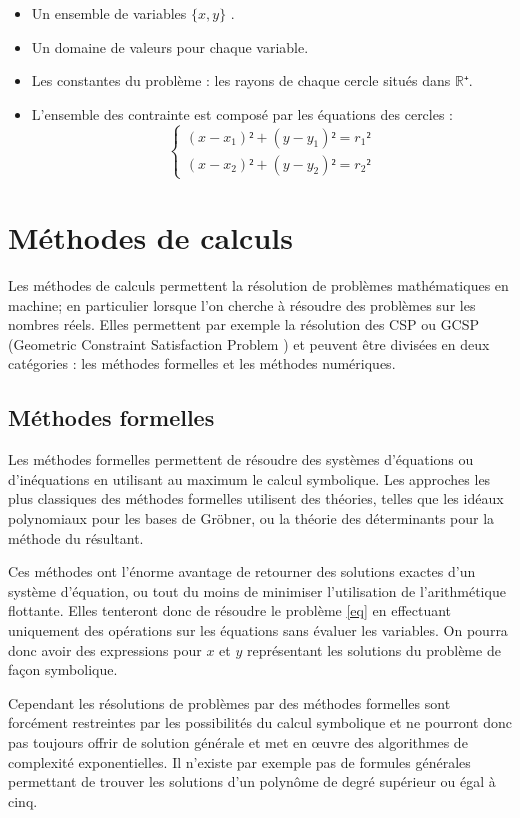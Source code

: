 \begin{itemize}
\item
Un ensemble de variables $\{x,y\}$ .
\item
Un domaine de valeurs pour chaque variable. 
\item
Les constantes du problème : les rayons de chaque cercle situés dans  $\mathbb{R⁺}$.
\item
L'ensemble des contrainte est composé par les équations des cercles :
\begin{equation}\label{eq}
\begin{cases}
(x-x_1)²+(y-y_1)² = r_1²\\
(x-x_2)²+(y-y_2)² = r_2²
\end{cases}
\end{equation}
\end{itemize}


\section{Méthodes de calculs}
Les méthodes de calculs permettent la résolution de problèmes mathématiques en machine; en particulier lorsque l'on cherche à résoudre des problèmes sur les nombres réels. Elles permettent par exemple la résolution des \textsc{CSP}  ou \textsc{GCSP} (Geometric Constraint Satisfaction Problem \cite{Jermann}) et peuvent être divisées en deux catégories : les méthodes formelles et les méthodes numériques.


\subsection{Méthodes formelles}
Les méthodes formelles permettent de résoudre des systèmes d'équations ou d'inéquations en utilisant au maximum le calcul symbolique. Les approches les plus classiques des méthodes formelles utilisent des théories, telles que les idéaux polynomiaux pour les bases de Gröbner, ou la théorie des déterminants pour la méthode du résultant.

 Ces méthodes ont l'énorme avantage de retourner des solutions exactes d'un système d'équation, ou tout du moins de minimiser l'utilisation de l'arithmétique flottante. Elles tenteront donc de résoudre le problème \ref{eq} en effectuant uniquement des opérations sur les équations sans évaluer les variables. On pourra donc avoir des expressions pour $x$ et $y$ représentant les solutions du problème de façon symbolique. 

Cependant les résolutions de problèmes par des méthodes formelles sont forcément restreintes par les possibilités du calcul symbolique et ne pourront donc pas toujours offrir de solution générale et met en œuvre des algorithmes de complexité exponentielles. Il n'existe par exemple pas de formules générales permettant de trouver les solutions d'un polynôme de degré supérieur ou égal à cinq.


